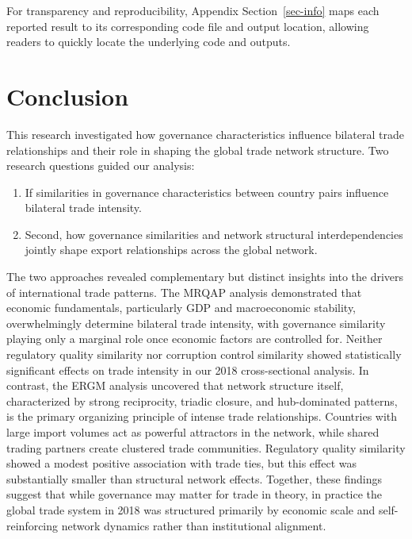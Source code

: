 \documentclass[
]{article}
\begin{document}
For transparency and reproducibility, Appendix Section~\ref{sec-info}
maps each reported result to its corresponding code file and output
location, allowing readers to quickly locate the underlying code and
outputs.

\section{Conclusion}\label{conclusion}

This research investigated how governance characteristics influence
bilateral trade relationships and their role in shaping the global trade
network structure. Two research questions guided our analysis:

\begin{enumerate}
\def\labelenumi{\arabic{enumi}.}
\item
  If similarities in governance characteristics between country pairs
  influence bilateral trade intensity.
\item
  Second, how governance similarities and network structural
  interdependencies jointly shape export relationships across the global
  network.
\end{enumerate}

The two approaches revealed complementary but distinct insights into the
drivers of international trade patterns. The MRQAP analysis demonstrated
that economic fundamentals, particularly GDP and macroeconomic
stability, overwhelmingly determine bilateral trade intensity, with
governance similarity playing only a marginal role once economic factors
are controlled for. Neither regulatory quality similarity nor corruption
control similarity showed statistically significant effects on trade
intensity in our 2018 cross-sectional analysis. In contrast, the ERGM
analysis uncovered that network structure itself, characterized by
strong reciprocity, triadic closure, and hub-dominated patterns, is the
primary organizing principle of intense trade relationships. Countries
with large import volumes act as powerful attractors in the network,
while shared trading partners create clustered trade communities.
Regulatory quality similarity showed a modest positive association with
trade ties, but this effect was substantially smaller than structural
network effects. Together, these findings suggest that while governance
may matter for trade in theory, in practice the global trade system in
2018 was structured primarily by economic scale and self-reinforcing
network dynamics rather than institutional alignment.
\end{document}
